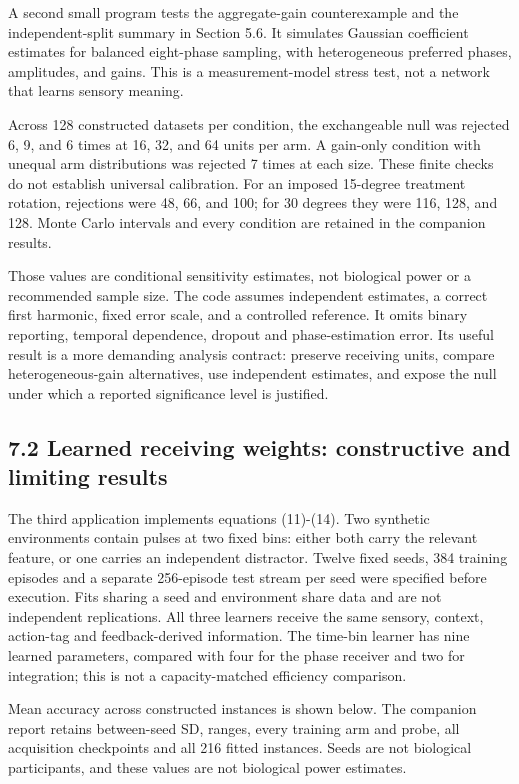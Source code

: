 \documentclass[
  american,
  11pt,
  letterpaper,
]{article}
\begin{document}
A second small program tests the aggregate-gain counterexample and the independent-split summary in Section 5.6. It simulates Gaussian coefficient estimates for balanced eight-phase sampling, with heterogeneous preferred phases, amplitudes, and gains. This is a measurement-model stress test, not a network that learns sensory meaning.

Across 128 constructed datasets per condition, the exchangeable null was rejected 6, 9, and 6 times at 16, 32, and 64 units per arm. A gain-only condition with unequal arm distributions was rejected 7 times at each size. These finite checks do not establish universal calibration. For an imposed 15-degree treatment rotation, rejections were 48, 66, and 100; for 30 degrees they were 116, 128, and 128. Monte Carlo intervals and every condition are retained in the companion results.

Those values are conditional sensitivity estimates, not biological power or a recommended sample size. The code assumes independent estimates, a correct first harmonic, fixed error scale, and a controlled reference. It omits binary reporting, temporal dependence, dropout and phase-estimation error. Its useful result is a more demanding analysis contract: preserve receiving units, compare heterogeneous-gain alternatives, use independent estimates, and expose the null under which a reported significance level is justified.

\subsection{7.2 Learned receiving weights: constructive and limiting results}\label{learned-receiving-weights-constructive-and-limiting-results}

The third application implements equations (11)-(14). Two synthetic environments contain pulses at two fixed bins: either both carry the relevant feature, or one carries an independent distractor. Twelve fixed seeds, 384 training episodes and a separate 256-episode test stream per seed were specified before execution. Fits sharing a seed and environment share data and are not independent replications. All three learners receive the same sensory, context, action-tag and feedback-derived information. The time-bin learner has nine learned parameters, compared with four for the phase receiver and two for integration; this is not a capacity-matched efficiency comparison.

Mean accuracy across constructed instances is shown below. The companion report retains between-seed SD, ranges, every training arm and probe, all acquisition checkpoints and all 216 fitted instances. Seeds are not biological participants, and these values are not biological power estimates.
\end{document}
